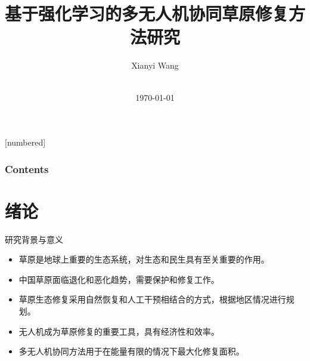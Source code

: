 \documentclass{ctexbeamer}
\title[\meetingname]{基于强化学习的多无人机协同草原修复方法研究 \cite{4358754} \\}
\author[X Wang]{Xianyi Wang}
\institute[LZU]{Lanzhou University}
\date[\mydate]{\meetingname\\\today}
\begin{document}
\begin{frame}[plain,t]
    \titlepage

\end{frame}
[numbered]
\begin{frame}
    \frametitle{Contents}
    \tableofcontents
\end{frame}
\section{绪论}
\begin{frame}{研究背景与意义}
    \begin{itemize}
    \item 草原是地球上重要的生态系统，对生态和民生具有至关重要的作用。
    \item 中国草原面临退化和恶化趋势，需要保护和修复工作。
    \item 草原生态修复采用自然恢复和人工干预相结合的方式，根据地区情况进行规划。
    \item 无人机成为草原修复的重要工具，具有经济性和效率。
    \item 多无人机协同方法用于在能量有限的情况下最大化修复面积。
    \end{itemize}
\end{frame}
\end{document}
